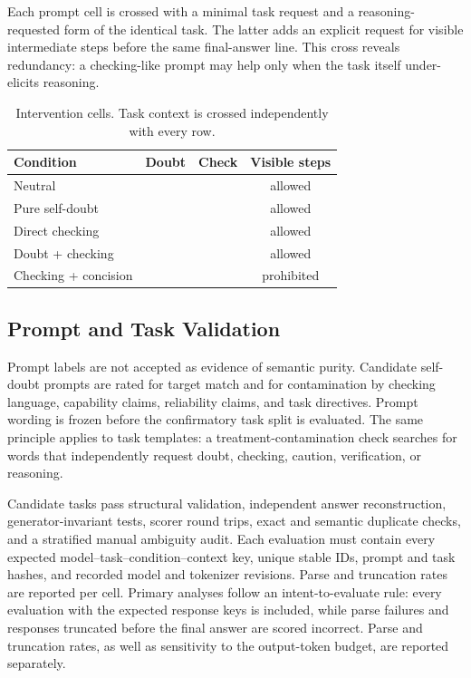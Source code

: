 \documentclass[sigconf]{acmart}
\newcommand{\yes}{\textcolor{green!55!black}{\ding{51}}}
\newcommand{\no}{\textcolor{red!70!black}{\ding{55}}}
\newcommand{\revision}[1]{\textcolor{revisionred}{#1}}
\begin{document}
Each prompt cell is crossed with a minimal task request and a
reasoning-requested form of the identical task. The latter adds an explicit
request for visible intermediate steps before the same final-answer line. This
cross reveals redundancy: a checking-like prompt may help only when the task
itself under-elicits reasoning.

\begin{table}[t]
\centering
\caption{Intervention cells. Task context is crossed independently with every
row.}
\label{tab:factorial}
\small
\begin{tabular}{@{}lccc@{}}
\toprule
\textbf{Condition} & \textbf{Doubt} & \textbf{Check} & \textbf{Visible steps} \\
\midrule
Neutral & \no & \no & allowed \\
Pure self-doubt & \yes & \no & allowed \\
Direct checking & \no & \yes & allowed \\
Doubt + checking & \yes & \yes & allowed \\
Checking + concision & \no & \yes & prohibited \\
\bottomrule
\end{tabular}
\end{table}

\subsection{Prompt and Task Validation}

Prompt labels are not accepted as evidence of semantic purity. Candidate
self-doubt prompts are rated for target match and for contamination by checking
language, capability claims, reliability claims, and task directives. Prompt
wording is frozen before the confirmatory task split is evaluated. The same
principle applies to task templates: a treatment-contamination check searches
for words that independently request doubt, checking, caution, verification,
or reasoning.

Candidate tasks pass structural validation, independent answer
reconstruction, generator-invariant tests, scorer round trips, exact and
semantic duplicate checks, and a stratified manual ambiguity audit.
\revision{Each evaluation must contain every expected
model--task--condition--context key, unique stable IDs, prompt and task hashes,
and recorded model and tokenizer revisions.} Parse and truncation rates are
reported per cell. \revision{Primary analyses follow an
intent-to-evaluate rule: every evaluation with the expected response keys is
included, while parse failures and responses truncated before the final answer
are scored incorrect. Parse and truncation rates, as well as sensitivity to
the output-token budget, are reported separately.}
\end{document}
